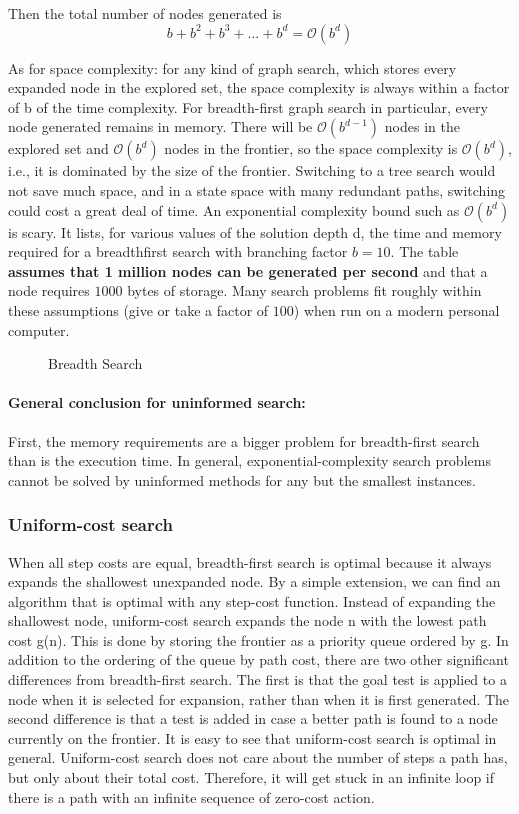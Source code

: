 Then the total number of nodes generated is
\[b + b^2 + b^3 + \dots + b^d
 = \mathcal{O}(b^d)\]

As for space complexity: for any kind of graph search, which stores every expanded node in the explored set, the space complexity is always within a factor of b of the time complexity. For breadth-first graph search in particular, every node generated remains in memory.
There will be $\mathcal{O}(b^{d-1})$ nodes in the explored set and $\mathcal{O}(b^d)$ nodes in the frontier, so the space complexity is $\mathcal{O}(b^d)$, i.e., it is dominated by the size of the frontier.
 Switching to a tree search would not save much space, and in a state space with many redundant paths, switching could cost a great deal of time.
An exponential complexity bound such as $\mathcal{O}(b^d)$ is scary. It lists, for various values of the solution depth d, the time and memory required for a breadthfirst search with branching factor $b = 10$. The table \textcolor{CadetBlue!90}{\textbf{assumes that 1 million nodes can be generated per second}} and that a node requires $1000$ bytes of storage. Many search problems fit roughly within these assumptions (give or take a factor of $100$) when run on a modern personal computer.
\begin{figure}[h!]
\centering
{}
\caption{Breadth Search}
\label{fig:Breadth Search}
\end{figure}

\paragraph{General conclusion for uninformed search:}
First, the memory requirements are a bigger problem for breadth-first search than is the execution time.
In general, exponential-complexity search problems
cannot be solved by uninformed methods for any but the smallest instances.
\subsubsection{Uniform-cost search}
When all step costs are equal, breadth-first search is optimal because it always expands the shallowest unexpanded node. By a simple extension, we can find an algorithm that is optimal with any step-cost function. Instead of expanding the shallowest node, uniform-cost search expands the node n with the lowest path cost g(n). This is done by storing the frontier as a priority queue ordered by g.
In addition to the ordering of the queue by path cost, there are two other significant differences from breadth-first search. The first is that the goal test is applied to a node when it is selected for expansion, rather than when it is first generated.
The second difference is that a test is added in case a better path is found to a node currently on the frontier.
It is easy to see that uniform-cost search is optimal in general.
Uniform-cost search does not care about the number of steps a path has, but only about their total cost. Therefore, it will get stuck in an infinite loop if there is a path with an infinite sequence of zero-cost action.

